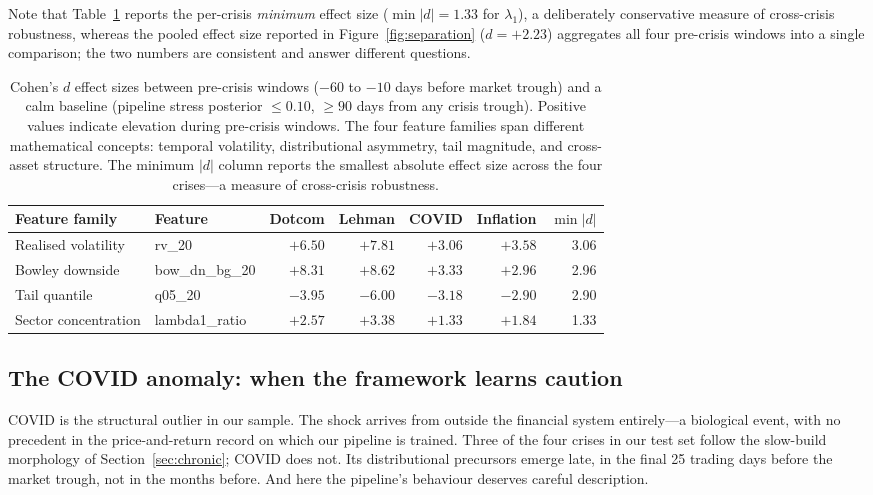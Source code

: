 \documentclass[11pt]{article}
\begin{document}
Note that Table~\ref{tab:cohend} reports the per-crisis
\emph{minimum} effect size ($\min|d| = 1.33$ for $\lambda_1$), a
deliberately conservative measure of cross-crisis robustness, whereas
the pooled effect size reported in Figure~\ref{fig:separation}
($d = +2.23$) aggregates all four pre-crisis windows into a single
comparison; the two numbers are consistent and answer different
questions.

\begin{table}[htbp]
  \centering
  \caption{Cohen's $d$ effect sizes between pre-crisis windows ($-60$ to
  $-10$ days before market trough) and a calm baseline (pipeline stress
  posterior $\le 0.10$, $\ge 90$ days from any crisis trough). Positive
  values indicate elevation during pre-crisis windows. The four feature
  families span different mathematical concepts: temporal volatility,
  distributional asymmetry, tail magnitude, and cross-asset structure.
  The minimum $|d|$ column reports the smallest absolute effect size
  across the four crises---a measure of cross-crisis robustness.}
  \label{tab:cohend}
  \begin{tabular}{llrrrrr}
    \toprule
    Feature family & Feature & Dotcom & Lehman & COVID & Inflation
      & $\min|d|$ \\
    \midrule
    Realised volatility   & rv\_20        & $+6.50$ & $+7.81$ & $+3.06$
      & $+3.58$ & 3.06 \\
    Bowley downside       & bow\_dn\_bg\_20 & $+8.31$ & $+8.62$ & $+3.33$
      & $+2.96$ & 2.96 \\
    Tail quantile         & q05\_20       & $-3.95$ & $-6.00$ & $-3.18$
      & $-2.90$ & 2.90 \\
    Sector concentration  & lambda1\_ratio & $+2.57$ & $+3.38$ & $+1.33$
      & $+1.84$ & 1.33 \\
    \bottomrule
  \end{tabular}
\end{table}

\subsection{The COVID anomaly: when the framework learns caution}
\label{sec:covid}

COVID is the structural outlier in our sample. The shock arrives from
outside the financial system entirely---a biological event, with no
precedent in the price-and-return record on which our pipeline is
trained. Three of the four crises in our test set follow the slow-build
morphology of Section~\ref{sec:chronic}; COVID does not. Its
distributional precursors emerge late, in the final 25 trading days
before the market trough, not in the months before. And here the
pipeline's behaviour deserves careful description.
\end{document}

